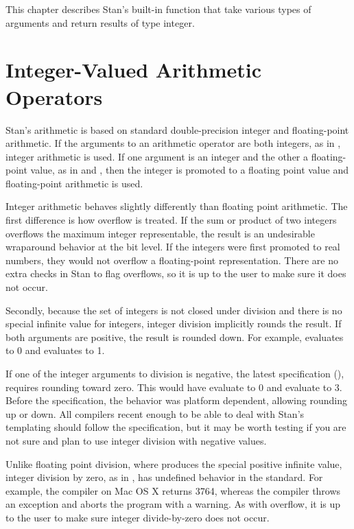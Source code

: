 \noindent
This chapter describes Stan's built-in function that take various
types of arguments and return results of type integer.


\section{Integer-Valued Arithmetic Operators}\label{int-arithmetic.section}

Stan's arithmetic is based on standard double-precision \Cpp integer and
floating-point arithmetic.  If the arguments to an arithmetic operator
are both integers, as in , integer arithmetic is used.  If
one argument is an integer and the other a floating-point value, as in
 and , then the integer is promoted to a floating
point value and floating-point arithmetic is used.

Integer arithmetic behaves slightly differently than floating point
arithmetic.  The first difference is how overflow is treated.  If the
sum or product of two integers overflows the maximum integer
representable, the result is an undesirable wraparound behavior at the
bit level.  If the integers were first promoted to real numbers, they
would not overflow a floating-point representation.  There are no
extra checks in Stan to flag overflows, so it is up to the user to
make sure it does not occur.

Secondly, because the set of integers is not closed under division and
there is no special infinite value for integers, integer division
implicitly rounds the result.  If both arguments are positive, the
result is rounded down.  For example,  evaluates to 0 and
 evaluates to 1.  

If one of the integer arguments to division is negative, the latest
\Cpp specification (), requires rounding toward zero.  This
would have  evaluate to 0 and  evaluate to
3.  Before the  specification, the behavior was platform
dependent, allowing rounding up or down.  All compilers recent enough
to be able to deal with Stan's templating should follow the 
specification, but it may be worth testing if you are not sure and
plan to use integer division with negative values.

Unlike floating point division, where  produces the
special positive infinite value, integer division by zero, as in
, has undefined behavior in the \Cpp standard.  For
example, the \clang compiler on Mac OS X returns 3764, whereas the
\gpp compiler throws an exception and aborts the program with a
warning.  As with overflow, it is up to the user to make sure integer
divide-by-zero does not occur.

